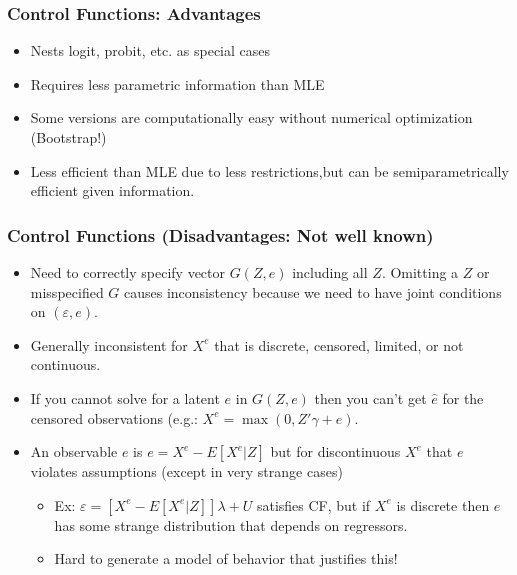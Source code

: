 \begin{frame}
\frametitle{Control Functions: Advantages}
\begin{itemize}
\item Nests logit, probit, etc. as special cases
\item Requires less parametric information than MLE
\item Some versions are computationally easy without numerical optimization (Bootstrap!)
\item Less efficient than MLE due to less restrictions,but can be semiparametrically efficient given information.
\end{itemize}
\end{frame}

\begin{frame}
\frametitle{Control Functions (Disadvantages: Not well known)}
\begin{itemize}
\item Need to correctly specify vector $G(Z,e)$ including all $Z$. Omitting a $Z$ or misspecified $G$ causes inconsistency because we need to have joint conditions on $(\varepsilon , e)$.
\item Generally inconsistent for $X^e$ that is discrete, censored, limited, or not continuous.
\item If you cannot solve for a latent $e$ in $G(Z,e)$ then you can't get $\hat{e}$ for the censored observations (e.g.: $X^e = \max(0, Z'\gamma + e)$.
\item An observable $e$ is $e = X^e - E[X^e | Z]$ but for discontinuous $X^e$ that $e$ violates assumptions (except in very strange cases)
\begin{itemize}
\item Ex: $\varepsilon =  [ X^e - E[X^e | Z]] \lambda + U$ satisfies CF, but if $X^e$ is discrete then $e$ has some strange distribution that depends on regressors. 
\item Hard to generate a model of behavior that justifies this!
\end{itemize}
\end{itemize}
\end{frame}



